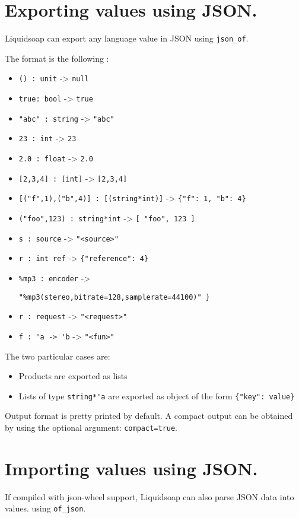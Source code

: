 \section{Exporting values using JSON.}
Liquidsoap can export any language value in JSON using
\verb+json_of+.

The format is the following :

\begin{itemize}
\item \verb+() : unit+ -> \verb+null+
\item \verb+true: bool+ -> \verb+true+
\item \verb+"abc" : string+ -> \verb+"abc"+
\item \verb+23 : int+ -> \verb+23+
\item \verb+2.0 : float+ -> \verb+2.0+
\item \verb+[2,3,4] : [int]+ -> \verb+[2,3,4]+
\item \verb+[("f",1),("b",4)] : [(string*int)]+ -> \verb+{"f": 1, "b": 4}+
\item \verb+("foo",123) : string*int+ -> \verb+[ "foo", 123 ]+
\item \verb+s : source+ -> \verb+"<source>"+
\item \verb+r : int ref+ -> \verb+{"reference": 4}+
\item \verb+%mp3 : encoder+ -> \begin{verbatim}
"%mp3(stereo,bitrate=128,samplerate=44100)" }
\end{verbatim}

\item \verb+r : request+ -> \verb+"<request>"+
\item \verb+f : 'a -> 'b+ -> \verb+"<fun>"+

\end{itemize}
The two particular cases are:

\begin{itemize}
\item Products are exported as lists
\item Lists of type \verb+string*'a+ are exported as object of the form \verb+{"key": value}+ 

\end{itemize}
Output format is pretty printed by default. A compact output can
be obtained by using the optional argument: \verb+compact=true+.

\section{Importing values using JSON.}
If compiled with json-wheel support, Liquidsoap can also
parse JSON data into values. using \verb+of_json+.

